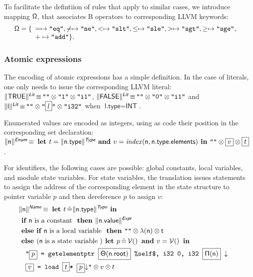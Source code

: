 \documentclass{llncs}
\newcommand{\trad}[2]{\ensuremath{\lVert \textsf{#1} \rVert^{\textit{#2}}}}
\newcommand{\nl}[0]{\ensuremath{\downarrow}}
\DeclareMathOperator{\isdef}{\equiv}
\DeclareMathOperator{\variable}{\mathcal{V}()}
\newcommand{\llvm}[1]{\texttt{#1}}
\newcommand{\B}[1]{\textsf{#1}}
\newcommand{\IF}[0]{\textbf{ if }}
\newcommand{\ELSIF}[0]{\textbf{ else if }}
\newcommand{\ELSE}[0]{\textbf{ else }}
\newcommand{\THEN}[0]{\textbf{ then }}
\newcommand{\LET}[0]{\textbf{ let }}
\DeclareMathOperator{\BE}{\hat{=}}
\newcommand{\IN}[0]{\textbf{ in }}
\newcommand{\AND}[0]{\textbf{ and }}
\newcommand{\PH}[1]{\framebox{$#1$}}
\newcommand{\sep}[0]{\otimes}
\newcommand{\local}[0]{\ensuremath{\sf\lambda}}
\newcommand{\opmap}[0]{\ensuremath{\sf\Omega}}
\newcommand{\idx}[0]{\ensuremath{\sf\Pi}}
\newcommand{\state}[0]{\ensuremath{\sf\Theta}}
\newcommand{\self}[0]{\llvm{\%self\$}}
\begin{document}
To facilitate the defintiion of rules that apply to similar cases, we introduce
mapping $\opmap$, that associates B operators to corresponding LLVM keywords:
$$\opmap = \{
\begin{array}[t]{l}
  = \mapsto \llvm{"eq"},
  \ne \mapsto \llvm{"ne"},
  < \mapsto \llvm{"slt"},
  \le \mapsto \llvm{"sle"},
  > \mapsto \llvm{"sgt"},
  \ge \mapsto \llvm{"sge"}, \\
  + \mapsto \llvm{"add"} \}.
  \end{array}
$$

\subsubsection{Atomic expressions} 

The encoding of atomic expressions has a simple definition. In the case of
literals, one only needs to issue the corresponding LLVM literal:
$\trad{TRUE}{\B{Lit}} \isdef \llvm{""} \sep \llvm{"1"} \sep \llvm{"i1"}$,
$\trad{FALSE}{\B{Lit}} \isdef \llvm{""} \sep \llvm{"0"} \sep \llvm{"i1"}$ and
$\trad{l}{\B{Lit}} \isdef \llvm{""} \sep \llvm{"\PH{l}"} \sep \llvm{"i32"}$ when
$\B{l.type} = \B{INT}$.

Enumerated values are encoded as integers, using as code their position in the
corresponding set declaration: $\trad{\B{n}}{\B{Enum}} \isdef \LET t =
\trad{\B{n.type}}{\B{Type}} \AND v = \mathit{index}(\B{n}, \B{n.type.elements})
\IN \llvm{""} \sep \PH{v} \sep \PH{t}$.

For identifiers, the following cases are possible: global constants, local
variables, and module state variables. For state variables, the translation
issues statements to assign the address of the corresponding element in the
state structure to pointer variable $p$ and then dereference $p$ to assign $v$:
\begin{align*}
\lefteqn{\trad{n}{\B{Name}} \isdef \LET t \BE \trad{n.type}{\B{Type}} \IN} \\
& \IF \B{n} \mbox{ is a constant } \THEN \trad{n.value}{\B{Expr}} \\
& \ELSIF \B{n} \mbox{ is a local variable } \THEN
\llvm{""} \sep \local(\B{n}) \sep t \\
& \ELSE (\B{n} \mbox{ is a state variable }) \LET p \BE \variable \AND v = \variable \IN \\
& \quad \llvm{"\PH{p} = getelementptr \PH{\state(\B{n.root})} \self, i32 0, i32 \PH{\idx(\B{n})} \nl} \\
& \quad \llvm{\PH{v} = load \PH{t}* \PH{p}\nl"} \sep v \sep t
\end{align*}
\end{document}
